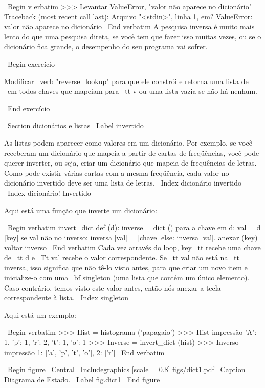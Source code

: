 \documentclass[10pt]{book}
\begin{document}
{{{{{{{\ Begin {v erbatim}
>>> Levantar ValueError, "valor não aparece no dicionário"
Traceback (most recent call last):
  Arquivo "<stdin>", linha 1, em?
ValueError: valor não aparece no dicionário
\ End {verbatim}
%
A pesquisa inversa é muito mais lento do que uma pesquisa direta, se você
tem que fazer isso muitas vezes, ou se o dicionário fica grande, o desempenho
do seu programa vai sofrer.

\ Begin {} exercício

Modificar \ verb "reverse_lookup" para que ele constrói e retorna uma lista
de {\ em todos} chaves que mapeiam para {\ tt v} ou uma lista vazia se não
há nenhum.

\ End {} exercício


\ Section {dicionários e listas}
\ Label {invertido}

As listas podem aparecer como valores em um dicionário. Por exemplo, se você
receberam um dicionário que mapeia a partir de cartas de freqüências, você
pode querer inverter, ou seja, criar um dicionário que mapeia
de freqüências de letras. Como pode existir várias cartas
com a mesma freqüência, cada valor no dicionário invertido
deve ser uma lista de letras.
\ Index {dicionário invertido}
\ Index {dicionário! Invertido}

Aqui está uma função que inverte um dicionário:

\ Begin {verbatim}
invert_dict def (d):
    inverse = dict ()
    para a chave em d:
        val = d [key]
        se val não no inverso:
            inversa [val] = [chave]
        else:
            inversa [val]. anexar (key)
    voltar inverso
\ End {verbatim}
%
Cada vez através do loop, {key \ tt} recebe uma chave de {\ tt d} e 
{\ Tt val} recebe o valor correspondente. Se {\ tt val} não está na {\ tt inversa},
isso significa que não tê-lo visto antes, para que criar um novo item e
inicialize-o com uma {\ bf singleton} (uma lista que contém um
único elemento). Caso contrário, temos visto este valor antes, então nós
anexar a tecla correspondente à lista.
\ Index {singleton}

Aqui está um exemplo:

\ Begin {verbatim}
>>> Hist = histograma ('papagaio')
>>> Hist impressão
{'A': 1, 'p': 1, 'r': 2, 't': 1, 'o': 1}
>>> Inverse = invert_dict (hist)
>>> Inverso impressão
{1: ['a', 'p', 't', 'o'], 2: ['r']}
\ End {verbatim}

\ Begin {figure}
\ Central
{\ Includegraphics [scale = 0.8] {figs/dict1.pdf}}
\ Caption {Diagrama de Estado.}
\ Label {} fig.dict1
\ End {figure}

}}}}}}}
\end{document}
